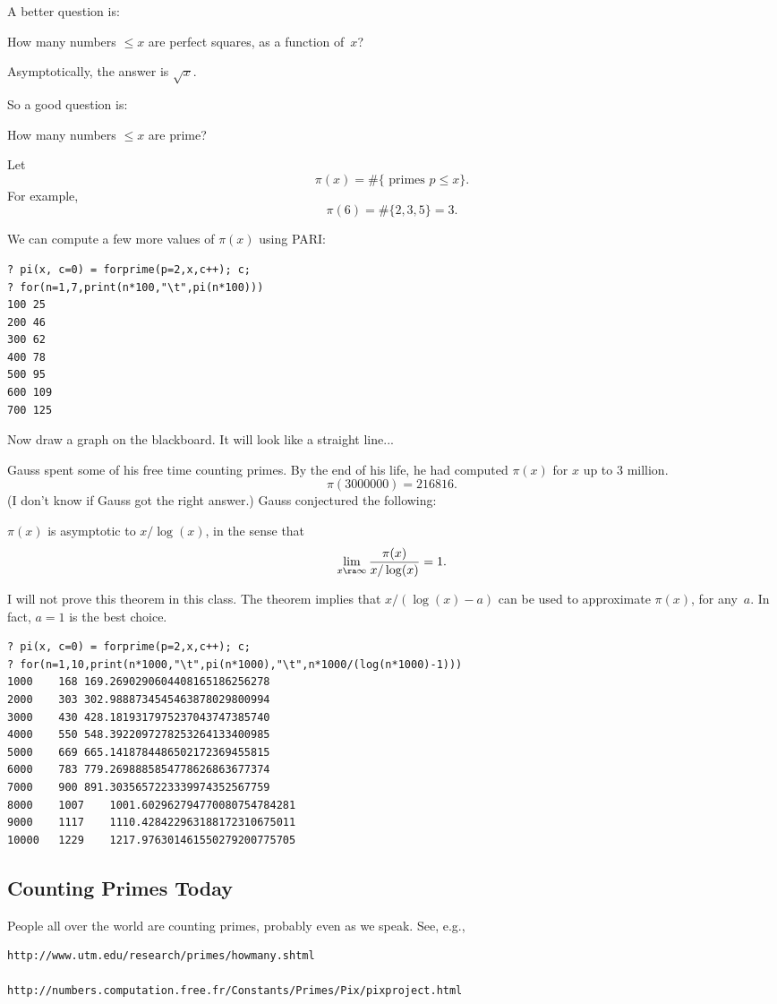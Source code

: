 \documentclass[11pt]{report}
\begin{document}
A better question is:
\begin{question}
  How many numbers $\leq x$ are perfect squares, as a function of~$x$?
\end{question}
 Asymptotically, the answer is $\sqrt{x}$.

So a good question is:
\begin{question}
  How many numbers $\leq x$ are prime?
\end{question}
Let
$$
  \pi(x) = \#\{\text{ primes } p\leq x\}.
$$
For example,
$$\pi(6) =\#\{2,3,5\} = 3.$$

We can compute a few more values of $\pi(x)$ using PARI:
\begin{verbatim}
? pi(x, c=0) = forprime(p=2,x,c++); c; 
? for(n=1,7,print(n*100,"\t",pi(n*100)))
100	25
200	46
300	62
400	78
500	95
600	109
700	125
\end{verbatim}
Now draw a graph on the blackboard.  It will look like a straight
line...

Gauss spent some of his free time counting primes.  By the end
of his life, he had computed $\pi(x)$ for $x$ up to $3$ million.
$$\pi(3000000)=216816.$$
(I don't know if Gauss got the right answer.)
Gauss conjectured the following:

\begin{theorem}
  $\pi(x)$ is asymptotic to $x/\log(x)$, in the sense that
  $$\lim_{x\ra \infty}  \frac{\pi(x)}{ x/\log(x)} = 1.$$
\end{theorem}
I will not prove this theorem in this class.
The theorem implies that $x/(\log(x)-a)$ can be used
to approximate $\pi(x)$, for any~$a$.  In fact, $a=1$
is the best choice.
\begin{verbatim}
? pi(x, c=0) = forprime(p=2,x,c++); c; 
? for(n=1,10,print(n*1000,"\t",pi(n*1000),"\t",n*1000/(log(n*1000)-1)))
1000	168	169.2690290604408165186256278
2000	303	302.9888734545463878029800994
3000	430	428.1819317975237043747385740
4000	550	548.3922097278253264133400985
5000	669	665.1418784486502172369455815
6000	783	779.2698885854778626863677374
7000	900	891.3035657223339974352567759
8000	1007	1001.602962794770080754784281
9000	1117	1110.428422963188172310675011
10000	1229	1217.976301461550279200775705
\end{verbatim}
\begin{remark}
\end{remark}

\subsection{Counting Primes Today}
People all over the world are counting primes, probably even as we speak.
See, e.g.,
\begin{verbatim}
http://www.utm.edu/research/primes/howmany.shtml

http://numbers.computation.free.fr/Constants/Primes/Pix/pixproject.html
\end{verbatim}
\end{document}
